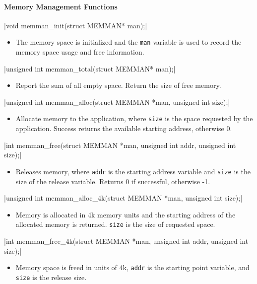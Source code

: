 \documentclass{swfcthesis}
\begin{document}
\paragraph{Memory Management Functions}

\csingle|void memman_init(struct MEMMAN* man);|
\begin{itemize}
\item The memory space is initialized and the \texttt{man} variable is used to record the
  memory space usage and free information.
\end{itemize}

\csingle|unsigned int memman_total(struct MEMMAN* man);|
\begin{itemize}
\item Report the sum of all empty space. Return the size of free memory.
\end{itemize}

\csingle|unsigned int memman_alloc(struct MEMMAN *man, unsigned int size);|
\begin{itemize}
\item Allocate memory to the application, where \texttt{size} is the space requested by the
  application. Success returns the available starting address, otherwise 0.
\end{itemize}

\csingle|int memman_free(struct MEMMAN *man, unsigned int addr, unsigned int size);|
\begin{itemize}
\item Releases memory, where \texttt{addr} is the starting address variable and
  \texttt{size} is the size of the release variable. Returns 0 if successful, otherwise
  -1.
\end{itemize}

\csingle|unsigned int memman_alloc_4k(struct MEMMAN *man, unsigned int size);|
\begin{itemize}
\item Memory is allocated in 4k memory units and the starting address of the allocated
  memory is returned. \texttt{size} is the size of requested space.
\end{itemize}

\csingle|int memman_free_4k(struct MEMMAN *man, unsigned int addr, unsigned int size);|
\begin{itemize}
\item Memory space is freed in units of 4k, \texttt{addr} is the starting
  point variable, and \texttt{size} is the release size.
\end{itemize}
\end{document}
